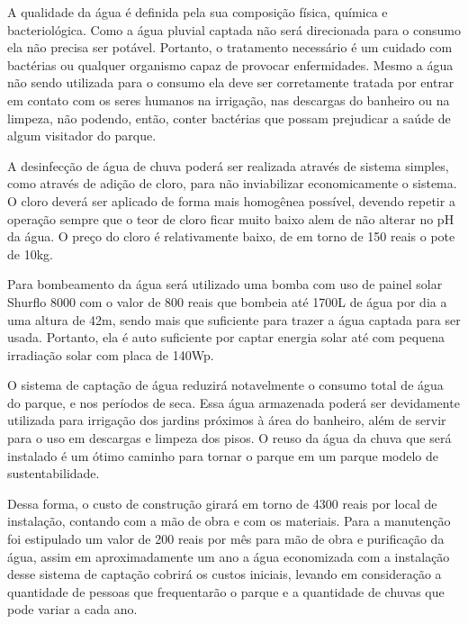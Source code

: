   A qualidade da \'agua \'e definida pela sua composi\c{c}\~ao f\'isica, qu\'imica e bacteriol\'ogica. Como a \'agua pluvial captada n\~ao ser\'a direcionada para o consumo ela n\~ao precisa ser pot\'avel. Portanto, o tratamento necess\'ario \'e um cuidado com bact\'erias ou qualquer organismo capaz de provocar enfermidades. \cite{MINISTERIODASAUDE} Mesmo a \'agua n\~ao sendo utilizada para o consumo ela deve ser corretamente tratada por entrar em contato com os seres humanos na irriga\c{c}\~ao, nas descargas do banheiro ou na limpeza, n\~ao podendo, ent\~ao, conter bact\'erias que possam prejudicar a sa\'ude de algum visitador do parque.
  
	A desinfec\c{c}\~ao de \'agua de chuva poder\'a ser realizada atrav\'es de sistema simples, como atrav\'es de adi\c{c}\~ao de cloro, para n\~ao inviabilizar economicamente o sistema. O cloro dever\'a ser aplicado de forma mais homog\^enea poss\'ivel, devendo repetir a opera\c{c}\~ao sempre que o teor de cloro ficar muito baixo alem de n\~ao alterar no pH da \'agua. O pre\c{c}o do cloro \'e relativamente baixo, de em torno de 150 reais o pote de 10kg.
	
	Para bombeamento da \'agua ser\'a utilizado uma bomba com uso de painel solar Shurflo 8000 com o valor de 800 reais que bombeia at\'e 1700L de \'agua por dia a uma altura de 42m, sendo mais que suficiente para trazer a \'agua captada para ser usada. Portanto, ela \'e auto suficiente por captar energia solar at\'e com pequena irradia\c{c}\~ao solar com placa de 140Wp.
	
	O sistema de capta\c{c}\~ao de \'agua reduzir\'a notavelmente o consumo total de \'agua do parque, e nos per\'iodos de seca. Essa \'agua armazenada poder\'a ser devidamente utilizada para irriga\c{c}\~ao dos jardins pr\'oximos \`a \'area do banheiro, al\'em de servir para o uso em descargas e limpeza dos pisos. O reuso da \'agua da chuva que ser\'a instalado \'e um \'otimo caminho para tornar o parque em um parque modelo de sustentabilidade.
	
	Dessa forma, o custo de constru\c{c}\~ao girar\'a em torno de 4300 reais por local de instala\c{c}\~ao, contando com a m\~ao de obra e com os materiais. Para a manuten\c{c}\~ao foi estipulado um valor de 200 reais por m\^es para m\~ao de obra e purifica\c{c}\~ao da \'agua, assim em aproximadamente um ano a \'agua economizada com a instala\c{c}\~ao desse sistema de capta\c{c}\~ao cobrir\'a os custos iniciais, levando em considera\c{c}\~ao a quantidade de pessoas que frequentar\~ao o parque e a quantidade de chuvas que pode variar a cada ano.
  
